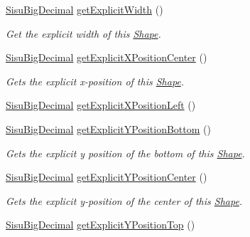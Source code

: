 \begin{DoxyCompactItemize}
\hyperlink{classcom_1_1aarrelaakso_1_1drawl_1_1_sisu_big_decimal}{Sisu\+Big\+Decimal} \hyperlink{classcom_1_1aarrelaakso_1_1drawl_1_1_shape_a398f978e0902c270a8f61d6827bcfd8f}{get\+Explicit\+Width} ()
\begin{DoxyCompactList}\small\item\em Get the explicit width of this \hyperlink{classcom_1_1aarrelaakso_1_1drawl_1_1_shape}{Shape}. \end{DoxyCompactList}\item 
\hyperlink{classcom_1_1aarrelaakso_1_1drawl_1_1_sisu_big_decimal}{Sisu\+Big\+Decimal} \hyperlink{classcom_1_1aarrelaakso_1_1drawl_1_1_shape_a079e4ec300c2ab3cd2514230b7428ea4}{get\+Explicit\+X\+Position\+Center} ()
\begin{DoxyCompactList}\small\item\em Gets the explicit x-\/position of this \hyperlink{classcom_1_1aarrelaakso_1_1drawl_1_1_shape}{Shape}. \end{DoxyCompactList}\item 
\hyperlink{classcom_1_1aarrelaakso_1_1drawl_1_1_sisu_big_decimal}{Sisu\+Big\+Decimal} \hyperlink{classcom_1_1aarrelaakso_1_1drawl_1_1_shape_a4e26548d18a063bff6bb0781526b909f}{get\+Explicit\+X\+Position\+Left} ()
\item 
\hyperlink{classcom_1_1aarrelaakso_1_1drawl_1_1_sisu_big_decimal}{Sisu\+Big\+Decimal} \hyperlink{classcom_1_1aarrelaakso_1_1drawl_1_1_shape_adfeaa06d8a6943d8f5bc90e91f0b4fac}{get\+Explicit\+Y\+Position\+Bottom} ()
\begin{DoxyCompactList}\small\item\em Gets the explicit y position of the bottom of this \hyperlink{classcom_1_1aarrelaakso_1_1drawl_1_1_shape}{Shape}. \end{DoxyCompactList}\item 
\hyperlink{classcom_1_1aarrelaakso_1_1drawl_1_1_sisu_big_decimal}{Sisu\+Big\+Decimal} \hyperlink{classcom_1_1aarrelaakso_1_1drawl_1_1_shape_a6499eaa6fd9cdef3d77fe20a5b039401}{get\+Explicit\+Y\+Position\+Center} ()
\begin{DoxyCompactList}\small\item\em Gets the explicit y-\/position of the center of this \hyperlink{classcom_1_1aarrelaakso_1_1drawl_1_1_shape}{Shape}. \end{DoxyCompactList}\item 
\hyperlink{classcom_1_1aarrelaakso_1_1drawl_1_1_sisu_big_decimal}{Sisu\+Big\+Decimal} \hyperlink{classcom_1_1aarrelaakso_1_1drawl_1_1_shape_af5d7293539d67234c9941e6abc3e642b}{get\+Explicit\+Y\+Position\+Top} ()

\end{DoxyCompactItemize}
